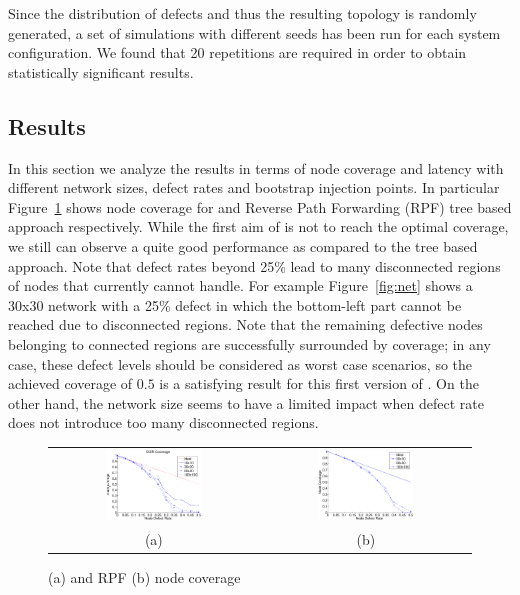 Since the distribution of defects and thus the resulting topology is randomly
generated, a set of simulations with different seeds has been run
for each system configuration. We found that 20 repetitions are
required in order to obtain statistically significant results.


\subsection{Results}
\label{sec:results}

In this section we analyze the results in terms of node
coverage and latency with different network sizes, defect rates and
bootstrap injection points. In particular
Figure~\ref{fig:results_coverage} shows
node coverage for \disr{} and Reverse Path Forwarding (RPF) tree based approach respectively. While
the first aim of \disr{} is not to reach the optimal coverage, we still
can observe a quite good performance as compared to the tree based
approach. Note that defect rates beyond 25\% lead to many disconnected
regions of nodes that \disr{} currently cannot handle.
For example Figure~\ref{fig:net} shows a 30x30 network with a 25\%
defect in which the bottom-left part cannot be reached due to
disconnected regions. Note that the remaining defective nodes belonging to
connected regions are successfully surrounded by \disr{} coverage; in any
case, these defect levels should be considered as worst case scenarios, so the
achieved coverage of $0.5$ is a satisfying result for this first
version of \disr{}. On the other hand, the network size seems to have a
limited impact when defect rate does not introduce too many disconnected
regions. 
\begin{figure}
\centering
\begin{tabular}{cc}
\includegraphics[width=0.48\textwidth]{pictures/set1.eps} & 
\includegraphics[width=0.48\textwidth]{pictures/coverage.eps} \\
(a) & (b) 
\end{tabular}
\caption{\disr{} (a) and RPF (b) node coverage}
\label{fig:results_coverage}
\end{figure}

